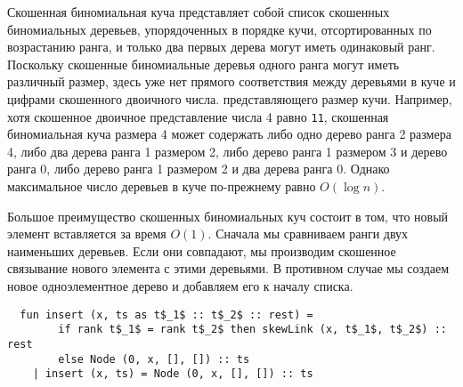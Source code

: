 \begin{frame}[fragile]{}
Скошенная биномиальная куча представляет собой список скошенных
биномиальных деревьев, упорядоченных в порядке кучи, отсортированных
по возрастанию ранга, и только два первых дерева могут иметь
одинаковый ранг. Поскольку скошенные биномиальные деревья одного ранга
могут иметь различный размер, здесь уже нет прямого соответствия между
деревьями в куче и цифрами скошенного двоичного числа. представляющего
размер кучи.  Например, хотя скошенное двоичное представление числа 4
равно \texttt{11}, скошенная биномиальная куча размера 4 может
содержать либо одно дерево ранга 2 размера 4, либо два дерева ранга 1
размером 2, либо дерево ранга 1 размером 3 и дерево ранга 0, либо
дерево ранга 1 размером 2 и два дерева ранга 0. Однако максимальное
число деревьев в куче по-прежнему равно $O(\log n)$.

Большое преимущество скошенных биномиальных куч состоит в том, что
новый элемент вставляется за время $O(1)$. Сначала мы сравниваем ранги
двух наименьших деревьев. Если они совпадают, мы производим скошенное
связывание нового элемента с этими деревьями. В противном случае мы
создаем новое одноэлементное дерево и добавляем его к началу списка.
\begin{lstlisting}
  fun insert (x, ts as t$_1$ :: t$_2$ :: rest) =
        if rank t$_1$ = rank t$_2$ then skewLink (x, t$_1$, t$_2$) :: rest
        else Node (0, x, [], []) :: ts
    | insert (x, ts) = Node (0, x, [], []) :: ts
\end{lstlisting}


\end{frame}
